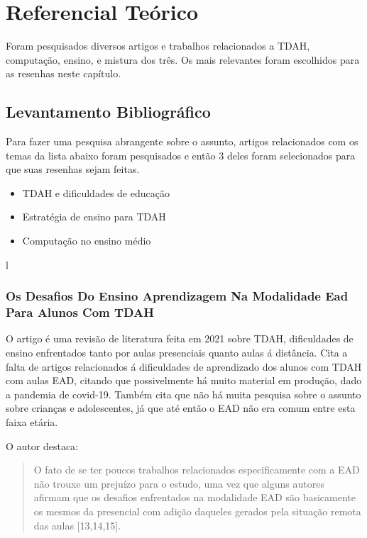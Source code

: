 \chapter{Referencial Teórico}

Foram pesquisados diversos artigos e trabalhos relacionados a TDAH, computação, ensino, e mistura dos três. Os mais relevantes foram escolhidos para as resenhas neste capítulo.


\section{Levantamento Bibliográfico}

Para fazer uma pesquisa abrangente sobre o assunto, artigos relacionados com os temas da lista abaixo foram pesquisados e então 3 deles foram selecionados para que suas resenhas sejam feitas.

\begin{itemize}
    \item TDAH e dificuldades de educação
	\item Estratégia de ensino para TDAH
    \item Computação no ensino médio
\end{itemize}l

\subsection{Os Desafios Do Ensino Aprendizagem Na Modalidade Ead Para Alunos Com TDAH}

O artigo\cite{okuyama} é uma revisão de literatura feita em 2021 sobre TDAH, dificuldades de ensino enfrentados tanto por aulas presenciais quanto aulas á distância. Cita a falta de artigos relacionados á dificuldades de aprendizado dos alunos com TDAH com aulas EAD, citando que possivelmente há muito material em produção, dado a pandemia de covid-19. Também cita que não há muita pesquisa sobre o assunto sobre crianças e adolescentes, já que até então o EAD não era comum entre esta faixa etária. 

O autor destaca:

\begin{quote}
O fato de se ter poucos trabalhos relacionados especificamente com a EAD não trouxe um prejuízo para o estudo, uma vez que alguns autores afirmam que os desafios enfrentados na modalidade EAD são basicamente os mesmos da presencial com adição daqueles gerados pela situação remota das aulas [13,14,15].
\end{quote}

